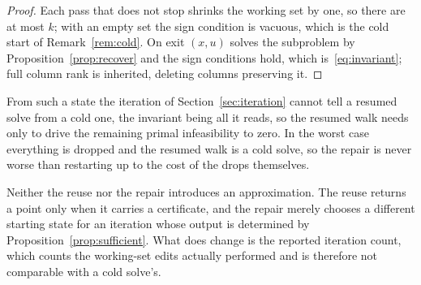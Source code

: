 \begin{proof}
Each pass that does not stop shrinks the working set by one, so there are at most
$k$; with an empty set the sign condition is vacuous, which is the cold start of
Remark~\ref{rem:cold}. On exit $(x,u)$ solves the subproblem by
Proposition~\ref{prop:recover} and the sign conditions hold,
which is~\eqref{eq:invariant}; full column rank is inherited, deleting columns
preserving it.
\end{proof}

From such a state the iteration of Section~\ref{sec:iteration} cannot tell a
resumed solve from a cold one, the invariant being all it reads, so the resumed
walk needs only to drive the remaining primal infeasibility to zero. In the worst
case everything is dropped and the resumed walk is a cold solve, so the repair is
never worse than restarting up to the cost of the drops themselves.

\begin{remark}
Neither the reuse nor the repair introduces an approximation. The reuse returns a
point only when it carries a certificate, and the repair merely chooses a
different starting state for an iteration whose output is determined by
Proposition~\ref{prop:sufficient}. What does change is the reported iteration
count, which counts the working-set edits actually performed and is therefore not
comparable with a cold solve's.
\end{remark}
